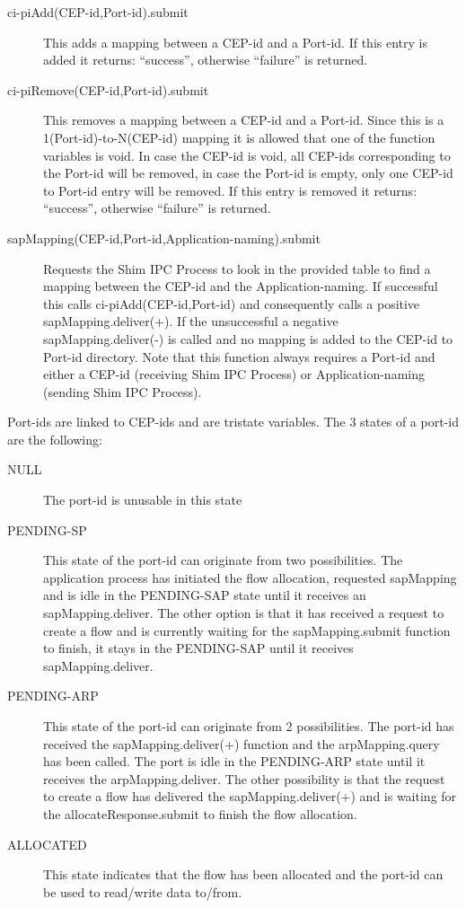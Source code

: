 \begin{description}
	\item[ci-piAdd(CEP-id,Port-id).submit] This adds a mapping between a CEP-id and a Port-id. If this entry is added it returns: ``success'', otherwise ``failure'' is returned.
	\item[ci-piRemove(CEP-id,Port-id).submit] This removes a mapping between a CEP-id and a Port-id. Since this is a 1(Port-id)-to-N(CEP-id) mapping it is allowed that one of the function variables is void. In case the CEP-id is void, all CEP-ids corresponding to the Port-id will be removed, in case the Port-id is empty, only one CEP-id to Port-id entry will be removed. If this entry is removed it returns: ``success'', otherwise ``failure'' is returned.
	\item[sapMapping(CEP-id,Port-id,Application-naming).submit] Requests the Shim IPC Process to look in the provided table to find a mapping between the CEP-id and the Application-naming. If successful this calls ci-piAdd(CEP-id,Port-id) and consequently calls a positive sapMapping.deliver(+). If the unsuccessful a negative sapMapping.deliver(-) is called and no mapping is added to the CEP-id to Port-id directory. Note that this function always requires a Port-id and either a CEP-id (receiving Shim IPC Process) or Application-naming (sending Shim IPC Process). 
\end{description}

\npar

Port-ids are linked to CEP-ids and are tristate variables. The 3 states of a port-id are the following:

\begin{description}
	\item[NULL] The port-id is unusable in this state
	\item[PENDING-SP] This state of the port-id can originate from two possibilities. The application process has initiated the flow allocation, requested sapMapping and is idle in the PENDING-SAP state until it receives an sapMapping.deliver. The other option is that it has received a request to create a flow and is currently waiting for the sapMapping.submit function to finish, it stays in the PENDING-SAP until it receives sapMapping.deliver.
	\item[PENDING-ARP] This state of the port-id can originate from 2 possibilities. The port-id has received the sapMapping.deliver(+) function and the arpMapping.query has been called. The port is idle in the PENDING-ARP state until it receives the arpMapping.deliver. The other possibility is that the request to create a flow has delivered the sapMapping.deliver(+) and is waiting for the allocateResponse.submit to finish the flow allocation.
	\item[ALLOCATED] This state indicates that the flow has been allocated and the port-id can be used to read/write data to/from.
\end{description}

